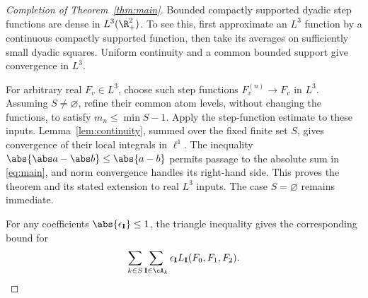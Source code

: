 \begin{proof}[Completion of Theorem~\ref{thm:main}]
Bounded compactly supported dyadic step functions are dense in
\(L^3(\R_+^2)\). To see this, first approximate an \(L^3\) function by
a continuous compactly supported function, then take its averages on
sufficiently small dyadic squares. Uniform continuity and a common
bounded support give convergence in \(L^3\).

For arbitrary real \(F_v\in L^3\), choose such step functions
\(F_v^{(n)}\to F_v\) in \(L^3\). Assuming \(S\ne\varnothing\),
refine their common atom levels, without changing the functions, to
satisfy \(m_n\le\min S-1\). Apply the step-function estimate to these
inputs. Lemma~\ref{lem:continuity}, summed over the fixed finite set
\(S\), gives convergence of their local integrals in \(\ell^1\).
The inequality \(\abs{\abs a-\abs b}\le\abs{a-b}\) permits passage to
the absolute sum in \eqref{eq:main}, and norm convergence handles its
right-hand side. This proves the theorem and its stated extension
to real \(L^3\) inputs. The case \(S=\varnothing\) remains immediate.

For any coefficients
\(\abs{\epsilon_{\mathbf I}}\le1\), the triangle inequality gives
the corresponding bound for
\[
 \sum_{k\in S}\sum_{\mathbf I\in\cA_k}
 \epsilon_{\mathbf I}L_{\mathbf I}(F_0,F_1,F_2).
 \qedhere
\]
\end{proof}
